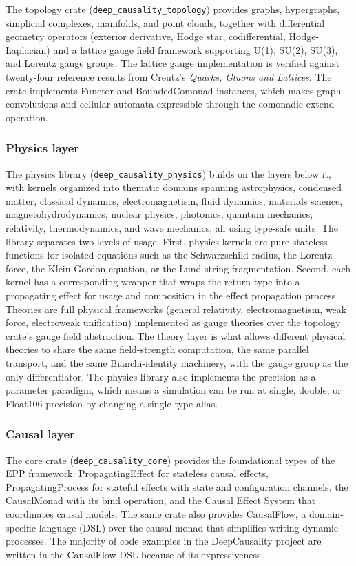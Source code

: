 The topology crate (\texttt{deep\_causality\_topology}) provides graphs, hypergraphs, simplicial complexes, manifolds, and point clouds, together with differential geometry operators (exterior derivative, Hodge star, codifferential, Hodge-Laplacian) and a lattice gauge field framework supporting U(1), SU(2), SU(3), and Lorentz gauge groups. The lattice gauge implementation is verified against twenty-four reference results from Creutz's \emph{Quarks, Gluons and Lattices}\cite{creutz1983quarks}. The crate implements Functor and BoundedComonad instances, which makes graph convolutions and cellular automata expressible through the comonadic extend operation.

\subsubsection{Physics layer}

The physics library (\texttt{deep\_causality\_physics}) builds on the layers below it, with kernels organized into thematic domains spanning astrophysics, condensed matter, classical dynamics, electromagnetism, fluid dynamics, materials science, magnetohydrodynamics, nuclear physics, photonics, quantum mechanics, relativity, thermodynamics, and wave mechanics, all using type-safe units. The library separates two levels of usage. First, physics kernels are pure stateless functions for isolated equations such as the Schwarzschild radius, the Lorentz force, the Klein-Gordon equation, or the Lund string fragmentation. Second, each kernel has a corresponding wrapper that wraps the return type into a propagating effect for usage and composition in the effect propagation process. Theories are full physical frameworks (general relativity, electromagnetism, weak force, electroweak unification) implemented as gauge theories over the topology crate's gauge field abstraction. The theory layer is what allows different physical theories to share the same field-strength computation, the same parallel transport, and the same Bianchi-identity machinery, with the gauge group as the only differentiator. The physics library also implements the precision as a parameter paradigm, which means a simulation can be run at single, double, or Float106 precision by changing a single type alias.

\subsubsection{Causal layer}

The core crate (\texttt{deep\_causality\_core}) provides the foundational types of the EPP framework: PropagatingEffect for stateless causal effects, PropagatingProcess for stateful effects with state and configuration channels, the CausalMonad with its bind operation, and the Causal Effect System that coordinates causal models. The same crate also provides CausalFlow, a domain-specific language (DSL) over the causal monad that simplifies writing dynamic processes. The majority of code examples in the DeepCausality project are written in the CausalFlow DSL because of its expressiveness.


